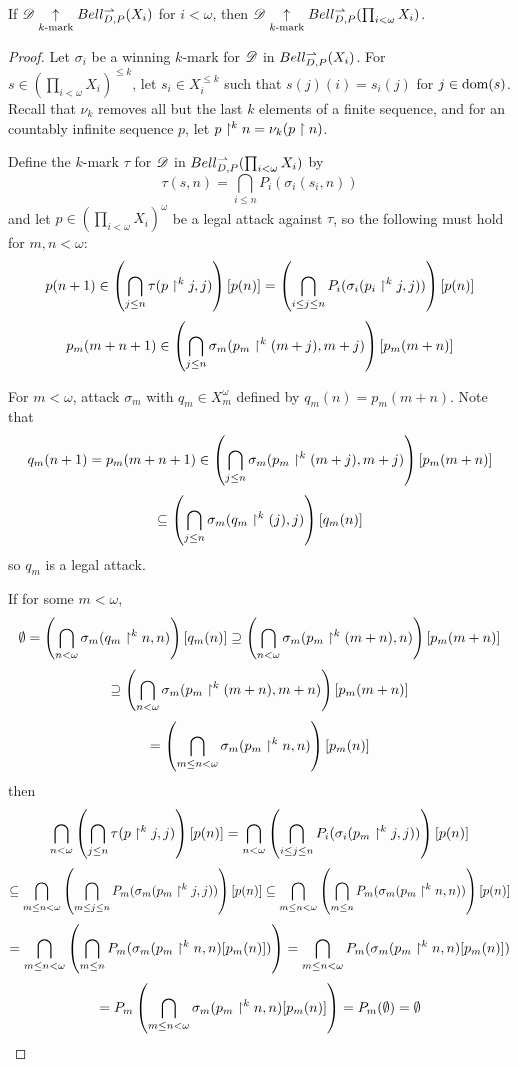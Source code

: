 \begin{thm}
  If $\mathscr{D}\underset{k\text{-mark}}{\uparrow} Bell_{D,P}^{\rightharpoonup}(X_i)$ for $i<\omega$, then
  $\mathscr{D}\underset{k\text{-mark}}{\uparrow} Bell_{D,P}^{\rightharpoonup}(\prod_{i<\omega}X_i)$.
\end{thm}

\begin{proof}
  Let $\sigma_i$ be a winning $k$-mark for $\mathscr{D}$ in $Bell_{D,P}^{\rightharpoonup}(X_i)$.
  For $s\in \left(\prod_{i<\omega}X_i\right)^{\leq k}$,
  let $s_i \in X_i^{\leq k}$ such that $s(j)(i)=s_i(j)$ for $j\in\textrm{dom}(s)$.
  Recall that $\nu_k$ removes all but the last $k$ elements of a finite
  sequence, and for an countably infinite sequence $p$,
  let $p\restriction^k n=\nu_k(p\restriction n)$.

  Define the $k$-mark $\tau$ for $\mathscr{D}$ in $Bell_{D,P}^{\rightharpoonup}(\prod_{i<\omega}X_i)$
  by
    \[
      \tau(s,n)
        =
      \bigcap_{i\leq n}
      P_i(\sigma_i(s_i,n))
    \]
  and let $p\in\left(\prod_{i<\omega}X_i\right)^\omega$ be a legal attack
  against $\tau$, so the following must hold for $m,n<\omega$:
    \[
      p(n+1)
        \in
      \left(\bigcap_{j\leq n}\tau(p\restriction^k j,j)\right)[p(n)]
        =
      \left(\bigcap_{i\leq j\leq n}P_i(\sigma_i(p_i\restriction^k j,j))\right)[p(n)]
    \]
    \[
      p_m(m+n+1)
        \in
      \left(\bigcap_{j\leq n}\sigma_m(p_m\restriction^k(m+j),m+j)\right)[p_m(m+n)]
    \]

  For $m<\omega$, attack $\sigma_m$ with $q_m\in X_m^\omega$ defined by
  $q_m(n)=p_m(m+n)$. Note that
    \[
      q_m(n+1) = p_m(m+n+1)
        \in
      \left(\bigcap_{j\leq n}\sigma_m(p_m\restriction^k(m+j),m+j)\right)[p_m(m+n)]
    \]
    \[
        \subseteq
      \left(\bigcap_{j\leq n}\sigma_m(q_m\restriction^k(j),j)\right)[q_m(n)]
    \]
  so $q_m$ is a legal attack.

  If for some $m<\omega$,
    \[
      \emptyset
        =
      \left(\bigcap_{n<\omega} \sigma_m(q_m\restriction^k n,n)\right)[q_m(n)]
        \supseteq
      \left(\bigcap_{n<\omega} \sigma_m(p_m\restriction^k(m+n),n)\right)[p_m(m+n)]
    \]
    \[
        \supseteq
      \left(\bigcap_{n<\omega} \sigma_m(p_m\restriction^k(m+n),m+n)\right)[p_m(m+n)]
    \]
    \[
        =
      \left(\bigcap_{m\leq n<\omega} \sigma_m(p_m\restriction^k n,n)\right)[p_m(n)]
    \]
  then
    \[
      \bigcap_{n<\omega} \left(
        \bigcap_{j\leq n} \tau(p\restriction^k j,j)
      \right)[p(n)]
        =
      \bigcap_{n<\omega} \left(
        \bigcap_{i\leq j\leq n} P_i(\sigma_i(p_m\restriction^k j,j))
      \right)[p(n)]
    \]
    \[
        \subseteq
      \bigcap_{m\leq n<\omega} \left(
        \bigcap_{m\leq j\leq n} P_m(\sigma_m(p_m\restriction^k j,j))
      \right)[p(n)]
        \subseteq
      \bigcap_{m\leq n<\omega} \left(
        \bigcap_{m\leq n} P_m(\sigma_m(p_m\restriction^k n,n))
      \right)[p(n)]
    \]
    \[
        =
      \bigcap_{m\leq n<\omega} \left(
        \bigcap_{m\leq n} P_m(\sigma_m(p_m\restriction^k n,n)[p_m(n)])
      \right)
        =
      \bigcap_{m\leq n<\omega}
      P_m(\sigma_m(p_m\restriction^k n,n)[p_m(n)])
    \]
    \[
        =
      P_m \left(
        \bigcap_{m\leq n<\omega}\sigma_m(p_m\restriction^k n,n)[p_m(n)]
      \right)
        =
      P_m(\emptyset)
        =
      \emptyset
    \]


\end{proof}
